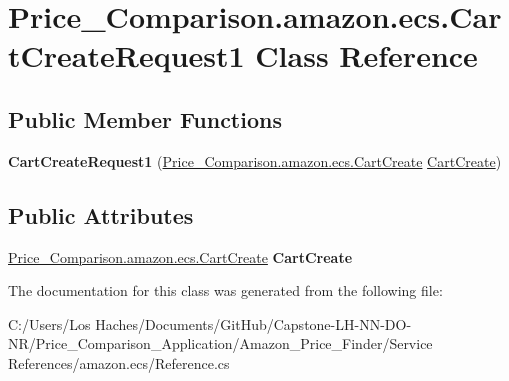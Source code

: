 \hypertarget{class_price___comparison_1_1amazon_1_1ecs_1_1_cart_create_request1}{\section{Price\-\_\-\-Comparison.\-amazon.\-ecs.\-Cart\-Create\-Request1 Class Reference}
\label{class_price___comparison_1_1amazon_1_1ecs_1_1_cart_create_request1}
}
\subsection*{Public Member Functions}
\begin{DoxyCompactItemize}
\item 
\hypertarget{class_price___comparison_1_1amazon_1_1ecs_1_1_cart_create_request1_aa1577572400c4faab09a5553848c305f}{{\bfseries Cart\-Create\-Request1} (\hyperlink{class_price___comparison_1_1amazon_1_1ecs_1_1_cart_create}{Price\-\_\-\-Comparison.\-amazon.\-ecs.\-Cart\-Create} \hyperlink{class_price___comparison_1_1amazon_1_1ecs_1_1_cart_create}{Cart\-Create})}\label{class_price___comparison_1_1amazon_1_1ecs_1_1_cart_create_request1_aa1577572400c4faab09a5553848c305f}

\end{DoxyCompactItemize}
\subsection*{Public Attributes}
\begin{DoxyCompactItemize}
\item 
\hypertarget{class_price___comparison_1_1amazon_1_1ecs_1_1_cart_create_request1_a2951634793beabe05f1db8bb3a19537f}{\hyperlink{class_price___comparison_1_1amazon_1_1ecs_1_1_cart_create}{Price\-\_\-\-Comparison.\-amazon.\-ecs.\-Cart\-Create} {\bfseries Cart\-Create}}\label{class_price___comparison_1_1amazon_1_1ecs_1_1_cart_create_request1_a2951634793beabe05f1db8bb3a19537f}

\end{DoxyCompactItemize}


The documentation for this class was generated from the following file\-:\begin{DoxyCompactItemize}
\item 
C\-:/\-Users/\-Los Haches/\-Documents/\-Git\-Hub/\-Capstone-\/\-L\-H-\/\-N\-N-\/\-D\-O-\/\-N\-R/\-Price\-\_\-\-Comparison\-\_\-\-Application/\-Amazon\-\_\-\-Price\-\_\-\-Finder/\-Service References/amazon.\-ecs/Reference.\-cs\end{DoxyCompactItemize}
